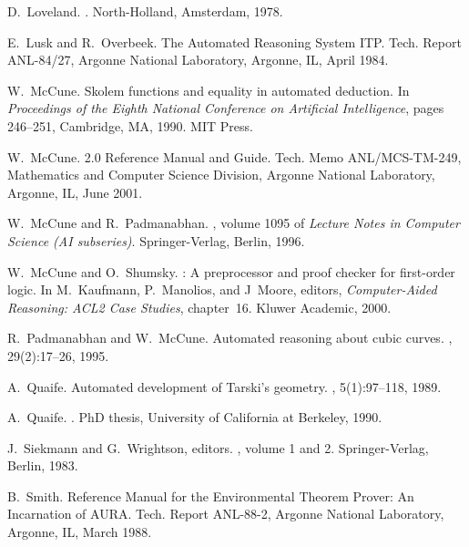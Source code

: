 \documentclass[11pt]{article}
\begin{document}
\begin{thebibliography}{10}
D.~Loveland.
.
\newblock North-Holland, Amsterdam, 1978.

E.~Lusk and R.~Overbeek.
\newblock The {A}utomated {R}easoning {S}ystem {ITP}.
\newblock Tech. Report ANL-84/27, Argonne National Laboratory, Argonne, IL,
  April 1984.

W.~McCune.
\newblock Skolem functions and equality in automated deduction.
\newblock In {\em Proceedings of the Eighth National Conference on Artificial
  Intelligence}, pages 246--251, Cambridge, MA, 1990. MIT Press.

W.~McCune.
 2.0 {R}eference {M}anual and {G}uide.
\newblock Tech. Memo ANL/MCS-TM-249, Mathematics and Computer Science Division,
  Argonne National Laboratory, Argonne, IL, June 2001.

W.~McCune and R.~Padmanabhan.
,
  volume 1095 of {\em Lecture Notes in Computer Science (AI subseries)}.
\newblock Springer-Verlag, Berlin, 1996.

W.~McCune and O.~Shumsky.
: A preprocessor and proof checker for first-order logic.
\newblock In M.~Kaufmann, P.~Manolios, and J~Moore, editors, {\em
  Computer-Aided Reasoning: ACL2 Case Studies}, chapter~16. Kluwer Academic,
  2000.

R.~Padmanabhan and W.~McCune.
\newblock Automated reasoning about cubic curves.
, 29(2):17--26,
  1995.

A.~Quaife.
\newblock Automated development of {T}arski's geometry.
, 5(1):97--118, 1989.

A.~Quaife.
.
\newblock PhD thesis, University of California at Berkeley, 1990.

J.~Siekmann and G.~Wrightson, editors.
, volume 1 and 2.
\newblock Springer-Verlag, Berlin, 1983.

B.~Smith.
\newblock Reference {M}anual for the {E}nvironmental {T}heorem {P}rover: {A}n
  {I}ncarnation of {AURA}.
\newblock Tech. Report ANL-88-2, Argonne National Laboratory, Argonne, IL,
  March 1988.


\end{thebibliography}
\end{document}
